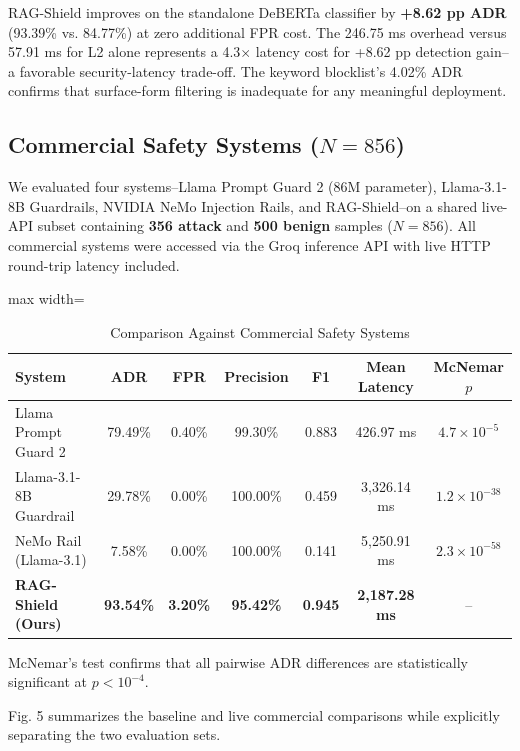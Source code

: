 \documentclass[conference]{IEEEtran}
\begin{document}
RAG-Shield improves on the standalone DeBERTa classifier by \textbf{+8.62 pp ADR} (93.39\% vs. 84.77\%) at zero additional FPR cost. The 246.75 ms overhead versus 57.91 ms for L2 alone represents a 4.3$\times$ latency cost for +8.62 pp detection gain--a favorable security-latency trade-off. The keyword blocklist's 4.02\% ADR confirms that surface-form filtering is inadequate for any meaningful deployment.


\subsection{Commercial Safety Systems ($N = 856$)}

We evaluated four systems--Llama Prompt Guard 2 (86M parameter), Llama-3.1-8B Guardrails, NVIDIA NeMo Injection Rails, and RAG-Shield--on a shared live-API subset containing \textbf{356 attack} and \textbf{500 benign} samples ($N = 856$). All commercial systems were accessed via the Groq inference API with live HTTP round-trip latency included.



\begin{table}[!t]
\centering
\caption{Comparison Against Commercial Safety Systems}
\label{tab:9}
\scriptsize
\begin{adjustbox}{max width=\textwidth}
\begin{tabular}{lcccccc}
\toprule
System & ADR & FPR & Precision & F1 & Mean Latency & McNemar $p$ \\
\midrule
Llama Prompt Guard 2 & 79.49\% & 0.40\% & 99.30\% & 0.883 & 426.97 ms & $4.7 \times 10^{-5}$ \\
Llama-3.1-8B Guardrail & 29.78\% & 0.00\% & 100.00\% & 0.459 & 3,326.14 ms & $1.2 \times 10^{-38}$ \\
NeMo Rail (Llama-3.1) & 7.58\% & 0.00\% & 100.00\% & 0.141 & 5,250.91 ms & $2.3 \times 10^{-58}$ \\
\textbf{RAG-Shield (Ours)} & \textbf{93.54\%} & \textbf{3.20\%} & \textbf{95.42\%} & \textbf{0.945} & \textbf{2,187.28 ms} & -- \\
\bottomrule
\end{tabular}
\end{adjustbox}
\end{table}


McNemar's test confirms that all pairwise ADR differences are statistically significant at $p < 10^{-4}$.


Fig. 5 summarizes the baseline and live commercial comparisons while explicitly separating the two evaluation sets.
\end{document}
